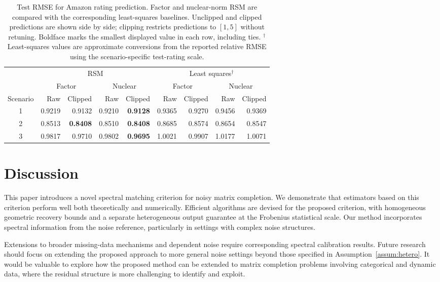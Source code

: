 \documentclass[numsec,webpdf,modern,large,namedate]{oup-authoring-template}
\theoremstyle{plain}
\theoremstyle{remark}
\newif\ifmarkchanges
\newenvironment{revision}{\begingroup\ifmarkchanges\color{red}\fi}{\endgroup}
\begin{document}
\begin{table}[!htbp]
\centering
\caption{Test RMSE for Amazon rating prediction. Factor and nuclear-norm RSM are compared with the corresponding least-squares baselines. Unclipped and clipped predictions are shown side by side; clipping restricts predictions to $[1,5]$ without retuning. Boldface marks the smallest displayed value in each row, including ties. $^{\dagger}$Least-squares values are approximate conversions from the reported relative RMSE using the scenario-specific test-rating scale.}
\label{tab:amazon_data}
\begingroup
\small
{}
\setlength{\tabcolsep}{4pt}
\begin{tabular}{@{}crrrrrrrr@{}}
\toprule
 & \multicolumn{4}{c}{RSM} & \multicolumn{4}{c}{Least squares$^{\dagger}$} \\
\cmidrule(lr){2-5}\cmidrule(lr){6-9}
 & \multicolumn{2}{c}{Factor} & \multicolumn{2}{c}{Nuclear} & \multicolumn{2}{c}{Factor} & \multicolumn{2}{c}{Nuclear} \\
\cmidrule(lr){2-3}\cmidrule(lr){4-5}\cmidrule(lr){6-7}\cmidrule(lr){8-9}
Scenario & Raw & Clipped & Raw & Clipped & Raw & Clipped & Raw & Clipped \\
\midrule
1 & 0.9219 & 0.9132 & 0.9210 & \textbf{0.9128} & 0.9365 & 0.9270 & 0.9456 & 0.9369 \\
2 & 0.8513 & \textbf{0.8408} & 0.8510 & \textbf{0.8408} & 0.8685 & 0.8574 & 0.8654 & 0.8547 \\
3 & 0.9817 & 0.9710 & 0.9802 & \textbf{0.9695} & 1.0021 & 0.9907 & 1.0177 & 1.0071 \\
\bottomrule
\end{tabular}
\endgroup
\end{table}

\begin{revision}
\section{Discussion}
\label{sec:discussion}

This paper introduces a novel spectral matching criterion for noisy matrix completion. We demonstrate that estimators based on this criterion perform well both theoretically and numerically. Efficient algorithms are devised for the proposed criterion, with homogeneous geometric recovery bounds and a separate
heterogeneous output guarantee at the Frobenius statistical scale. Our method incorporates spectral information from the noise reference, particularly in settings with complex noise structures.

\label{sec:dependence_discussion}
Extensions to broader missing-data mechanisms and dependent noise require corresponding spectral calibration results. Future research should focus on extending the proposed approach to more general noise settings beyond those specified in Assumption~\ref{assum:hetero}. It would be valuable to explore how the proposed method can be extended to matrix completion problems involving categorical and dynamic data, where the residual structure is more challenging to identify and exploit.

\end{revision}
\end{document}
